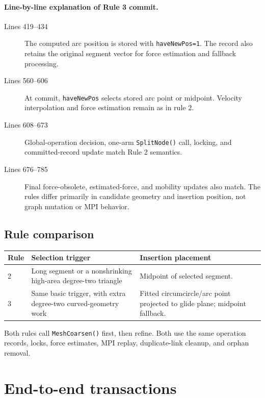 \documentclass[11pt]{article}
\newcommand{\code}[1]{\texorpdfstring{\nolinkurl{#1}}{#1}}
\begin{document}
\paragraph{Line-by-line explanation of Rule 3 commit.}
\begin{description}
\item[Lines 419--434] The computed arc position is stored with
\code{haveNewPos=1}. The record also retains the original segment vector for
force estimation and fallback processing.
\item[Lines 560--606] At commit, \code{haveNewPos} selects stored arc point or
midpoint. Velocity interpolation and force estimation remain as in rule 2.
\item[Lines 608--673] Global-operation decision, one-arm \code{SplitNode()}
call, locking, and committed-record update match Rule 2 semantics.
\item[Lines 676--785] Final force-obsolete, estimated-force, and mobility
updates also match. The rules differ primarily in candidate geometry and
insertion position, not graph mutation or MPI behavior.
\end{description}

\subsection{Rule comparison}

\begin{center}
\begin{tabularx}{0.96\linewidth}{@{}lXX@{}}
\toprule
Rule & Selection trigger & Insertion placement \\
\midrule
2 & Long segment or a nonshrinking high-area degree-two triangle & Midpoint of selected segment. \\
3 & Same basic trigger, with extra degree-two curved-geometry work & Fitted circumcircle/arc point projected to glide plane; midpoint fallback. \\
\bottomrule
\end{tabularx}
\end{center}

Both rules call \code{MeshCoarsen()} first, then refine. Both use the same
operation records, locks, force estimates, MPI replay, duplicate-link cleanup,
and orphan removal.

\section{End-to-end transactions}
\end{document}
